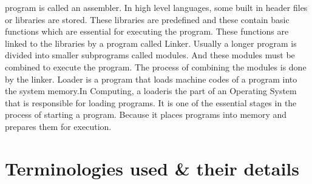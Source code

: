 \documentclass[a4paper,12pt]{extarticle}
\begin{document}
	program is called an assembler.\newline
	In high level languages, some built in header files or libraries are stored. These
	libraries are predefined and these contain basic functions which are essential for executing
	the program. These functions are linked to the libraries by a program called
	Linker. Usually a longer program is divided into smaller subprograms called modules.
	And these modules must be combined to execute the program. The process of
	combining the modules is done by the linker.\newline
	Loader is a program that loads machine codes of a program into the system memory.In
	Computing, a loaderis the part of an Operating System that is responsible
	for loading programs. It is one of the essential stages in the process of starting a
	program. Because it places programs into memory and prepares them for execution.	
	\pagebreak
	\section{Terminologies used \& their details}
\end{document}
